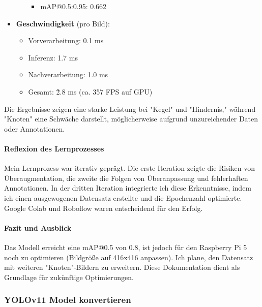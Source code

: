 \begin{itemize}
\begin{itemize}
\begin{itemize}
            \item mAP@0.5:0.95: 0.662 
        \end{itemize}  
    \end{itemize}  
    \item \textbf{Geschwindigkeit} (pro Bild): 
    \begin{itemize} 
        \item Vorverarbeitung: 0.1 ms 
        \item Inferenz: 1.7 ms 
        \item Nachverarbeitung: 1.0 ms 
        \item Gesamt: \~2.8 ms (ca. 357 FPS auf GPU) 
    \end{itemize}  
\end{itemize}
Die Ergebnisse zeigen eine starke Leistung bei "Kegel" und "Hindernis," während "Knoten" eine Schwäche darstellt, möglicherweise aufgrund unzureichender Daten oder Annotationen.

\paragraph{Reflexion des Lernprozesses}

Mein Lernprozess war iterativ geprägt. Die erste Iteration zeigte die Risiken von Überaugmentation, die zweite die Folgen von Überanpassung und fehlerhaften Annotationen. In der dritten Iteration integrierte ich diese Erkenntnisse, indem ich einen ausgewogenen Datensatz erstellte und die Epochenzahl optimierte. Google Colab und Roboflow waren entscheidend für den Erfolg.

\paragraph{Fazit und Ausblick}

Das Modell erreicht eine mAP@0.5 von 0.8, ist jedoch für den Raspberry Pi 5 noch zu optimieren (Bildgröße auf 416x416 anpassen). Ich plane, den Datensatz mit weiteren "Knoten"-Bildern zu erweitern. Diese Dokumentation dient als Grundlage für zukünftige Optimierungen.

 







\subsubsection{YOLOv11 Model konvertieren}
\label{convert-yolo}

